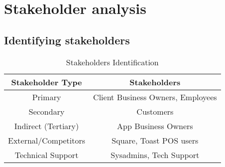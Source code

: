 \documentclass[]{VUMIFTemplateClass}
\begin{document}
\section{Stakeholder analysis}

\subsection{Identifying stakeholders}



\begin{table}[h]
  \centering
  \begin{tabular}{|c|c|}
    \hline
    Stakeholder Type    & Stakeholders \\ \hline
    Primary             & Client Business Owners, Employees \\ \hline
    Secondary           & Customers \\ \hline
    Indirect (Tertiary) & App Business Owners \\ \hline
    External/Competitors & Square, Toast POS users \\ \hline
    Technical Support   & Sysadmins, Tech Support \\ \hline
  \end{tabular}
  \caption{Stakeholders Identification}
  \label{tab:stakeholders}
\end{table}




\end{document}
